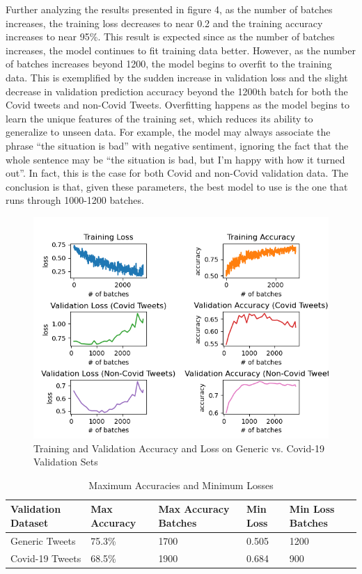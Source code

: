 \documentclass[letterpaper]{article} %
\begin{document}
Further analyzing the results presented in figure 4, as the number of batches increases, the training loss decreases to near 0.2 and the training accuracy increases to near 95\%. This result is expected since as the number of batches increases, the model continues to fit training data better. However, as the number of batches increases beyond 1200, the model begins to overfit to the training data. This is exemplified by the sudden increase in validation loss and the slight decrease in validation prediction accuracy beyond the 1200th batch for both the Covid tweets and non-Covid Tweets. Overfitting happens as the model begins to learn the unique features of the training set, which reduces its ability to generalize to unseen data. For example, the model may always associate the phrase \textquotedblleft{}the situation is bad\textquotedblright{} with negative sentiment, ignoring the fact that the whole sentence may be \textquotedblleft{}the situation is bad, but I'm happy with how it turned out\textquotedblright{}. In fact, this is the case for both Covid and non-Covid validation data. The conclusion is that, given these parameters, the best model to use is the one that runs through 1000-1200 batches.

\begin{figure}
  \includegraphics[width=\linewidth]{figure4.png}
  \caption{Training and Validation Accuracy and Loss on Generic vs. Covid-19 Validation Sets}
  \label{fig:fig4}
\end{figure}

\begin{table}
    \begin{tabularx}{\columnwidth}{|X|X|X|X|X|}
        \hline
        Validation Dataset & Max Accuracy & Max Accuracy Batches & Min Loss & Min Loss Batches \\
        \hline
Generic Tweets & 75.3\% & 1700 & 0.505 & 1200 \\
\hline
Covid-19 Tweets & 68.5\% & 1900 & 0.684 & 900 \\
        \hline
    \end{tabularx}
    \caption{Maximum Accuracies and Minimum Losses}
\end{table}

\newpage
\nocite{*}


\end{document}
